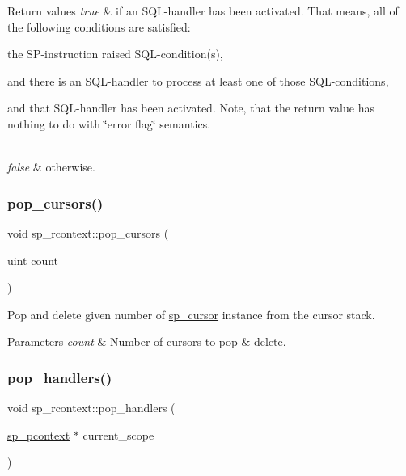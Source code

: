 \begin{DoxyRetVals}{Return values}
{\em true} & if an S\+QL-\/handler has been activated. That means, all of the following conditions are satisfied\+:
\begin{DoxyItemize}
\item the SP-\/instruction raised S\+QL-\/condition(s),
\item and there is an S\+QL-\/handler to process at least one of those S\+QL-\/conditions,
\item and that S\+QL-\/handler has been activated. Note, that the return value has nothing to do with \char`\"{}error flag\char`\"{} semantics.
\end{DoxyItemize}\\
\hline
{\em false} & otherwise. \\
\hline
\end{DoxyRetVals}
\mbox{\label{classsp__rcontext_aa98f42267d6988a304267b554f71a860}} 
\subsubsection{\texorpdfstring{pop\+\_\+cursors()}{pop\_cursors()}}
{\footnotesize\ttfamily void sp\+\_\+rcontext\+::pop\+\_\+cursors (\begin{DoxyParamCaption}\item[{uint}]{count }\end{DoxyParamCaption})}

Pop and delete given number of \mbox{\hyperlink{classsp__cursor}{sp\+\_\+cursor}} instance from the cursor stack.


\begin{DoxyParams}{Parameters}
{\em count} & Number of cursors to pop \& delete. \\
\hline
\end{DoxyParams}
\mbox{\label{classsp__rcontext_a26ec647bb1d2520182d8b5d1ea9f60ad}} 
\subsubsection{\texorpdfstring{pop\+\_\+handlers()}{pop\_handlers()}}
{\footnotesize\ttfamily void sp\+\_\+rcontext\+::pop\+\_\+handlers (\begin{DoxyParamCaption}\item[{\mbox{\hyperlink{classsp__pcontext}{sp\+\_\+pcontext}} $\ast$}]{current\+\_\+scope }\end{DoxyParamCaption})}


